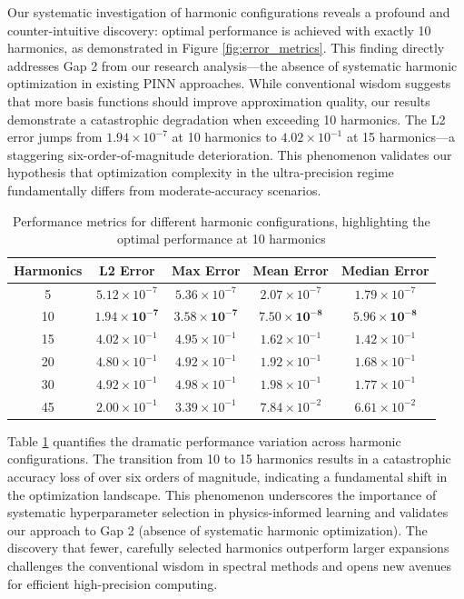 Our systematic investigation of harmonic configurations reveals a profound and counter-intuitive discovery: optimal performance is achieved with exactly 10 harmonics, as demonstrated in Figure \ref{fig:error_metrics}. This finding directly addresses Gap 2 from our research analysis—the absence of systematic harmonic optimization in existing PINN approaches. While conventional wisdom suggests that more basis functions should improve approximation quality, our results demonstrate a catastrophic degradation when exceeding 10 harmonics. The L2 error jumps from $1.94 \times 10^{-7}$ at 10 harmonics to $4.02 \times 10^{-1}$ at 15 harmonics—a staggering six-order-of-magnitude deterioration. This phenomenon validates our hypothesis that optimization complexity in the ultra-precision regime fundamentally differs from moderate-accuracy scenarios.

\begin{table}[ht]
    \centering
    \caption{Performance metrics for different harmonic configurations, highlighting the optimal performance at 10 harmonics}
    \label{tab:harmonic_comparison}
    \begin{tabular}{|c|c|c|c|c|}
    \hline
    \textbf{Harmonics} & \textbf{L2 Error} & \textbf{Max Error} & \textbf{Mean Error} & \textbf{Median Error} \\ \hline
    5    & $5.12 \times 10^{-7}$ & $5.36 \times 10^{-7}$ & $2.07 \times 10^{-7}$ & $1.79 \times 10^{-7}$ \\ \hline
    10   & $\mathbf{1.94 \times 10^{-7}}$ & $\mathbf{3.58 \times 10^{-7}}$ & $\mathbf{7.50 \times 10^{-8}}$ & $\mathbf{5.96 \times 10^{-8}}$ \\ \hline
    15   & $4.02 \times 10^{-1}$ & $4.95 \times 10^{-1}$ & $1.62 \times 10^{-1}$ & $1.42 \times 10^{-1}$ \\ \hline
    20   & $4.80 \times 10^{-1}$ & $4.92 \times 10^{-1}$ & $1.92 \times 10^{-1}$ & $1.68 \times 10^{-1}$ \\ \hline
    30   & $4.92 \times 10^{-1}$ & $4.98 \times 10^{-1}$ & $1.98 \times 10^{-1}$ & $1.77 \times 10^{-1}$ \\ \hline
    45   & $2.00 \times 10^{-1}$ & $3.39 \times 10^{-1}$ & $7.84 \times 10^{-2}$ & $6.61 \times 10^{-2}$ \\ \hline
    \end{tabular}
\end{table}

Table \ref{tab:harmonic_comparison} quantifies the dramatic performance variation across harmonic configurations. The transition from 10 to 15 harmonics results in a catastrophic accuracy loss of over six orders of magnitude, indicating a fundamental shift in the optimization landscape. This phenomenon underscores the importance of systematic hyperparameter selection in physics-informed learning and validates our approach to Gap 2 (absence of systematic harmonic optimization). The discovery that fewer, carefully selected harmonics outperform larger expansions challenges the conventional wisdom in spectral methods and opens new avenues for efficient high-precision computing.

